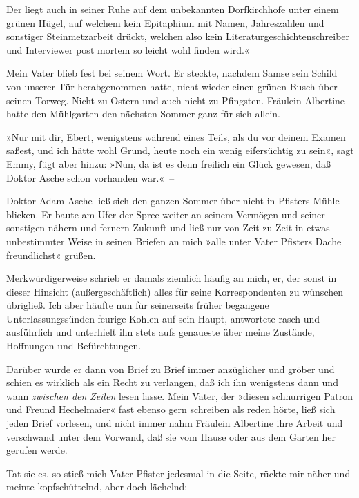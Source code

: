 Der liegt auch in seiner Ruhe auf dem unbekannten Dorfkirchhofe
unter einem grünen Hügel, auf welchem kein Epitaphium mit Namen,
Jahreszahlen und sonstiger Steinmetzarbeit drückt, welchen also
kein Literaturgeschichtenschreiber und Interviewer post mortem so
leicht wohl finden wird.«

Mein Vater blieb fest bei seinem Wort. Er steckte, nachdem Samse
sein Schild von unserer Tür herabgenommen hatte, nicht wieder einen
grünen Busch über seinen Torweg. Nicht zu Ostern und auch nicht zu
Pfingsten. Fräulein Albertine hatte den Mühlgarten den nächsten
Sommer ganz für sich allein.

»Nur mit dir, Ebert, wenigstens während eines Teils, als du vor
deinem Examen saßest, und ich hätte wohl Grund, heute noch ein
wenig eifersüchtig zu sein«, sagt Emmy, fügt aber hinzu: »Nun, da
ist es denn freilich ein Glück gewesen, daß Doktor Asche schon
vorhanden war.«~–

Doktor Adam Asche ließ sich den ganzen Sommer über nicht in
Pfisters Mühle blicken. Er baute am Ufer der Spree weiter an seinem
Vermögen und seiner sonstigen nähern und fernern Zukunft und ließ
nur von Zeit zu Zeit in etwas unbestimmter Weise in seinen Briefen
an mich »alle unter Vater Pfisters Dache freundlichst« grüßen.

Merkwürdigerweise schrieb er damals ziemlich häufig an mich, er,
der sonst in dieser Hinsicht (außergeschäftlich) alles für seine
Korrespondenten zu wünschen übrigließ. Ich aber häufte nun für
seinerseits früher begangene Unterlassungssünden feurige Kohlen auf
sein Haupt, antwortete rasch und ausführlich und unterhielt ihn
stets aufs genaueste über meine Zustände, Hoffnungen und
Befürchtungen.

Darüber wurde er dann von Brief zu Brief immer anzüglicher und
gröber und schien es wirklich als ein Recht zu verlangen, daß ich
ihn wenigstens dann und wann \emph{zwischen den} \emph{Zeilen}
lesen lasse. Mein Vater, der »diesen schnurrigen Patron und Freund
Hechelmaier« fast ebenso gern schreiben als reden hörte, ließ sich
jeden Brief vorlesen, und nicht immer nahm Fräulein Albertine ihre
Arbeit und verschwand unter dem Vorwand, daß sie vom Hause oder aus
dem Garten her gerufen werde.

Tat sie es, so stieß mich Vater Pfister jedesmal in die Seite,
rückte mir näher und meinte kopfschüttelnd, aber doch lächelnd:


